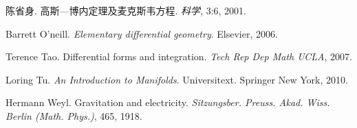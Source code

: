 \documentclass{article}
\newcommand{\tmtextit}[1]{{\itshape{#1}}}
\begin{document}
\begin{thebibliography}{1}
  陈省身.
  {\newblock}高斯---博内定理及麦克斯韦方程.
  {\newblock}\tmtextit{科学}, 3:6, 2001.{\newblock}
  
  Barrett O'neill. {\newblock}\tmtextit{Elementary
  differential geometry}. {\newblock}Elsevier, 2006.{\newblock}
  
  Terence Tao. {\newblock}Differential forms
  and integration. {\newblock}\tmtextit{Tech Rep Dep Math UCLA},
  2007.{\newblock}
  
  Loring Tu. {\newblock}\tmtextit{An
  Introduction to Manifolds}. {\newblock}Universitext. Springer New York,
  2010.{\newblock}
  
  Hermann Weyl. {\newblock}Gravitation and
  electricity. {\newblock}\tmtextit{Sitzungsber. Preuss. Akad. Wiss. Berlin
  (Math. Phys.)}, 465, 1918.{\newblock}
\end{thebibliography}
\end{document}
